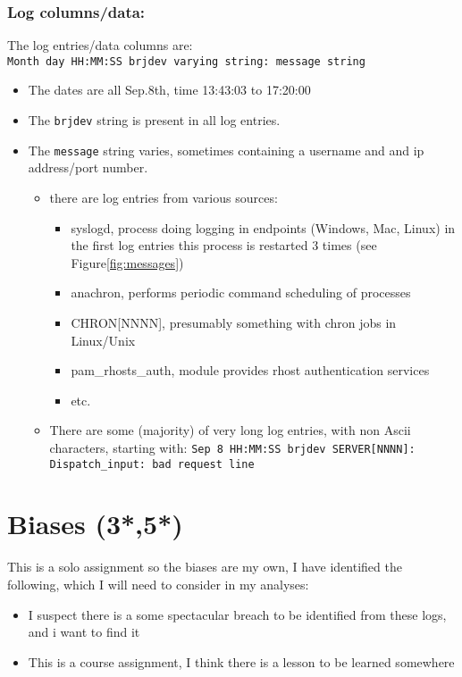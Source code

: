 \documentclass[
	letterpaper, %
	10pt, %
	unnumberedsections, %
	twoside, %
]{APAAssignment}
\begin{document}
\subsubsection{Log columns/data:} The log entries/data columns are: \\
\texttt{\textquotesingle{}Month\textquotesingle{}\ \textquotesingle{}day\textquotesingle{}\ \textquotesingle{}HH:MM:SS\textquotesingle{}\ \textquotesingle{}brjdev\textquotesingle{}\ \textquotesingle{}varying\ string\textquotesingle{}:\ \textquotesingle{}message\ string\textquotesingle{}}
\begin{itemize}
   \item The dates are all Sep.8th, time 13:43:03 to 17:20:00
   \item The \texttt{brjdev} string is present in all log entries. 
   \item The \texttt{message} string varies, sometimes containing a username and and ip address/port number.
   \begin{itemize}
	  \item there are log entries from various sources:
	  \begin{itemize}
	      \item syslogd, process doing logging in endpoints (Windows, Mac, Linux)\cite{syslog} in the first log entries this process is restarted 3 times (see Figure\ref{fig:messages})
		  \item anachron, performs periodic command scheduling of processes \cite{anacron}
		  \item CHRON[NNNN], presumably something with chron jobs in Linux/Unix
		  \item pam\_rhosts\_auth, module provides rhost authentication services\cite{pamRhostsAuth}   
		  \item etc.
	  \end{itemize}
	  \item There are some (majority) of very long log entries, with non Ascii characters, starting with: \texttt{Sep  8 HH:MM:SS brjdev SERVER[NNNN]: Dispatch\_input: bad request line}
   \end{itemize}
\end{itemize}


\section{Biases (3*,5*)}
This is a solo assignment so the biases are my own, I have identified the following, which I will need to consider in my analyses:
\begin{itemize}
	\item I suspect there is a some spectacular breach to be identified from these logs, and i want to find it 
	\item This is a course assignment, I think there is a lesson to be learned somewhere
\end{itemize}
\end{document}
